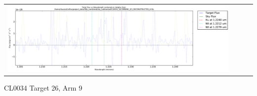 \documentclass[10pt,letterpaper]{article}
\begin{document}
\begin{table}[h!]
\begin{center}
\begin{tabular}{ >{\centering\arraybackslash}m{2.5in} >{\centering\arraybackslash}m{2.5in} >{\centering\arraybackslash}m{2.5in} >{\centering\arraybackslash}m{2.3in}}
\includegraphics[scale=0.45]{../figures/CL0034_YJ/COMBINE_SCI_RECONSTRUCTED_6_Halpha.pdf}
\end{tabular}
\end{center}
\end{table}

\newpage

CL0034 Target 26, Arm 9 \\
\end{document}
